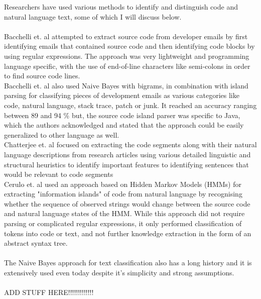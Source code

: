 \documentclass[12pt]{scrreprt}
\begin{document}
Researchers have used various methods to identify and distinguish code and natural language text, some of which I will discuss below. \\
\\ Bacchelli et. al \cite{bachemail} attempted to extract source code from developer emails by first identifying emails that contained source code and then identifying code blocks by using regular expressions. The approach was very lightweight and programming language specific, with the use of end-of-line characters like semi-colons in order to find source code lines. \\ Bacchelli et. al \cite{bachcontent} also used Naive Bayes with bigrams, in combination with island parsing for classifying pieces of development emails as various categories like code, natural language, stack trace, patch or junk. It reached an accuracy ranging between 89 and 94 \% but, the source code island parser was specific to Java, which the authors acknowledged and stated that the approach could be easily generalized to other language as well. \\ Chatterjee et. al \cite{chattter} focused on extracting the code segments along with their natural language descriptions from research articles using various detailed linguistic and structural heuristics to identify important features to identifying sentences that would be relevant to code segments \\ Cerulo et. al \cite{cerulohmm} used an approach based on Hidden Markov Models (HMMs) for extracting "information islands" of code from natural language by recognising whether the sequence of observed strings would change between the source code and natural language states of the HMM. While this approach did not require parsing or complicated regular expressions, it only performed classification of tokens into code or text, and not further knowledge extraction in the form of an abstract syntax tree.\\
\\ The Naive Bayes approach for text classification also has a long history and it is extensively used even today despite it's simplicity and strong assumptions. \\
\\ ADD STUFF HERE!!!!!!!!!!!!!
\end{document}
